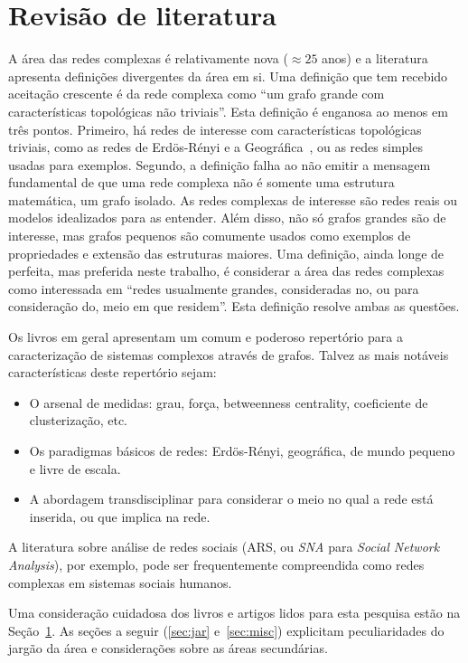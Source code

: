 \documentclass[a4paper,openright,12pt]{report} %
\begin{document}
\section{Revisão de literatura}
A área das redes complexas é relativamente nova ($\approx 25$ anos)
e a literatura apresenta definições divergentes da área em si.
Uma definição que tem recebido aceitação crescente
é da rede complexa como ``um grafo grande com características topológicas
não triviais''. Esta definição é enganosa ao menos em três pontos.
Primeiro, há redes de interesse com características topológicas triviais, como as redes de Erdös-Rényi e a Geográfica~\cite{newman}, ou as redes simples usadas para exemplos.
Segundo, a definição falha ao não emitir a mensagem fundamental de que uma rede complexa não é somente uma estrutura matemática, um grafo isolado. As redes complexas de interesse são redes reais ou modelos idealizados para as entender.
Além disso, não só grafos grandes são de interesse, mas grafos pequenos são comumente usados como exemplos de propriedades e extensão das estruturas maiores.
Uma definição, ainda longe de perfeita, mas preferida neste trabalho, é considerar a área das redes complexas como interessada em
``redes usualmente grandes, consideradas no, ou para consideração do,
meio em que residem''.
Esta definição resolve ambas as questões.

Os livros em geral apresentam um comum e poderoso repertório para a caracterização de sistemas complexos através de grafos. Talvez as mais notáveis características deste repertório sejam:
\begin{itemize}
    \item O arsenal de medidas: grau, força, betweenness centrality, coeficiente de clusterização, etc.
    \item Os paradigmas básicos de redes: Erdös-Rényi, geográfica, de mundo pequeno e livre de escala.
    \item A abordagem transdisciplinar para considerar o meio no qual a rede está inserida, ou que implica na rede.
\end{itemize}

A literatura sobre análise de redes sociais (ARS, ou \emph{SNA} para \emph{Social Network Analysis}), por exemplo, pode ser frequentemente compreendida como redes complexas em sistemas sociais humanos.

Uma consideração cuidadosa dos livros e artigos lidos para esta pesquisa estão na Seção~\ref{}. As seções a seguir (\ref{sec:jar} e~\ref{sec:misc})
explicitam peculiaridades do jargão da área e considerações sobre as áreas secundárias.
\end{document}
